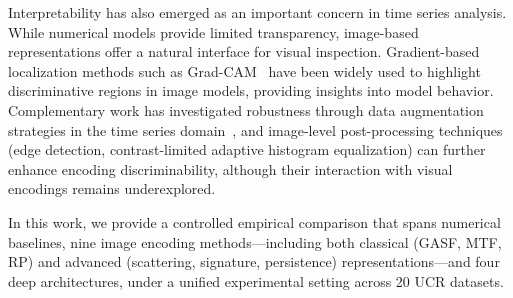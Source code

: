 Interpretability has also emerged as an important concern in time series
analysis.
While numerical models provide limited transparency, image-based
representations offer a natural interface for visual inspection.
Gradient-based localization methods such as
Grad-CAM~\cite{selvaraju2017gradcam} have been widely used to highlight
discriminative regions in image models, providing insights into model
behavior.
Complementary work has investigated robustness through data augmentation
strategies in the time series
domain~\cite{iglesias2023augmentation}, and image-level post-processing
techniques (edge detection, contrast-limited adaptive histogram equalization)
can further enhance encoding discriminability, although their interaction
with visual encodings remains underexplored.

In this work, we provide a controlled empirical comparison that spans
numerical baselines, nine image encoding methods---including both classical
(GASF, MTF, RP) and advanced (scattering, signature, persistence)
representations---and four deep architectures, under a unified experimental
setting across 20 UCR datasets.
